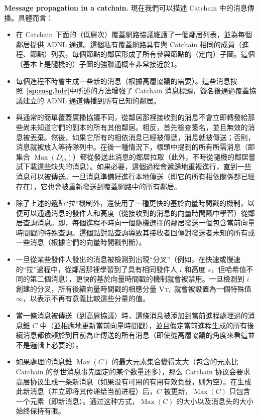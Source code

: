 \documentclass[12pt,oneside]{article}
\def\makepoint#1{\medbreak\noindent{\bf #1.\ }}
\def\nxpoint{\refstepcounter{subsection}%
  \smallbreak\makepoint{\thesubsection}}
\def\refpoint#1{{\rm\textbf{\ref{#1}}}}
\let\ptref=\refpoint
\def\emb#1{\textbf{#1.}}
\def\opsc#1{\operatorname{\textsc{#1}}}
\def\Max{\operatorname{Max}}
\def\VT{\opsc{Vt}}
\begin{document}
\nxpoint\emb{Message propagation in a catchain}\label{sp:cc.msg.prop}
現在我們可以描述 Catchain 中的消息傳播。具體而言：
\begin{itemize}
\item 在 Catchain 下面的（低層次）覆蓋網路協議維護了一個鄰居列表，並為每個鄰居提供 ADNL 通道。這個私有覆蓋網路具有與 Catchain 相同的成員（進程、節點）列表，每個節點的鄰居形成了所有參與節點的（定向）子圖。這個（基本上是隨機的）子圖的強聯通概率非常接近於1。
\item 每個進程不時會生成一些新的消息（根據高層協議的需要）。這些消息按照~\ptref{sp:msg.hdr}中所述的方法增強了 Catchain 消息標頭，簽名後通過覆蓋協議建立的 ADNL 通道傳播到所有已知的鄰居。
\item 與通常的簡單覆蓋廣播協議不同，從鄰居那裡接收到的消息不會立即轉發給那些尚未知道它們的副本的所有其他鄰居。相反，首先檢查簽名，並且無效的消息被丟棄。然後，如果它所有的相依消息已經被傳遞，消息就被傳送；否則，消息就被放入等待隊列中。在後一種情況下，標頭中提到的所有所需消息（即集合 $\Max(D_m)$）都從發送此消息的鄰居拉取（此外，不時從隨機的鄰居嘗試下載這些缺失的消息）。如果必要，這個過程會遞歸地重複進行，直到一些消息可以被傳送。一旦消息準備好進行本地傳送（即它的所有相依關係都已經存在），它也會被重新發送到覆蓋網路中的所有鄰居。
\item 除了上述的遞歸“拉”機制外，還使用了一種更快的基於向量時間戳的機制，以便可以通過消息的發件人和高度（從接收到的消息的向量時間戳中學習）從鄰居查詢消息。即，每個進程不時向一個隨機選擇的鄰居發送一個包含當前向量時間戳的特殊查詢。這個點對點查詢導致其接收者回傳對發送者未知的所有或一些消息（根據它們的向量時間戳判斷）。
\item 一旦從某些發件人發出的消息被檢測到出現“分叉”（例如，在快速或慢速的“拉”過程中，從鄰居那裡學習到了具有相同發件人 $i$ 和高度 $s$，但哈希值不同的第二個消息），更快的基於向量時間戳的機制就會被禁用。一旦檢測到 $i$ 創建的分叉，所有後續向量時間戳的相應分量 $\VT_i$ 就會被設置為一個特殊值 $\infty$，以表示不再有意義比較這些分量的值。
\item 當一條消息被傳送（到高層協議）時，這條消息被添加到當前進程處理過的消息錐 $C$ 中（並相應地更新當前向量時間戳），並且假定當前進程生成的所有後續消息都依賴於到目前為止傳送的所有消息（即使從高層協議的角度來看這並不是邏輯上必要的）。
\item 如果處理的消息錐 $\Max(C)$ 的最大元素集合變得太大（包含的元素比 Catchain 的创世消息事先固定的某个数量还多），那么 Catchain 协议会要求高层协议生成一条新消息（如果没有可用的有用有效负载，则为空）。在生成此新消息（并立即将其传递给当前进程）后，$C$ 被更新，$\Max(C)$ 只包含一个元素（即新消息）。通过这种方式，$\Max(C)$ 的大小以及消息头的大小始终保持有限。

\end{itemize}
\end{document}
